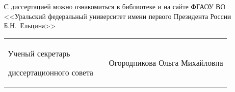 \vspace{0.008\paperheight plus1fill}
\noindent
С диссертацией можно ознакомиться в библиотеке
и на сайте ФГАОУ ВО
<<Уральский федеральный университет имени первого Президента России Б.Н.~Ельцина>>

\vspace{0.008\paperheight plus1fill}

\vspace{0.008\paperheight plus1fill}
\noindent%
\begin{tabularx}{\textwidth}{@{}%
>{\raggedright\arraybackslash}b{18em}@{}
>{\centering\arraybackslash}X
r
@{}}
    Ученый секретарь\par
    диссертационного совета
    &
    &
    Огородникова Ольга Михайловна
\end{tabularx}


\clearpage
